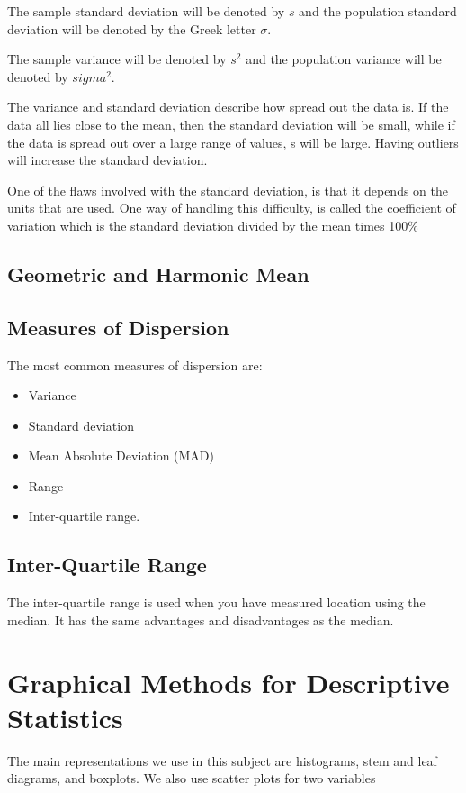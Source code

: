 \documentclass[12pt]{article}
\begin{document}
The sample standard deviation will be denoted by $s$ and the population standard deviation will be denoted by the Greek letter $\sigma$.

The sample variance will be denoted by $s^2$ and the population variance will be denoted by $sigma^2$.

The variance and standard deviation describe how spread out the data is.  If the data all lies close to the mean, then the standard deviation will be small, while if the data is spread out over a large range of values, s will be large.  Having outliers will increase the standard deviation.

One of the flaws involved with the standard deviation, is that it depends on the units that are used.  One way of handling this difficulty, is called the coefficient of variation which is the standard deviation divided by the mean times 100\%

\subsection{Geometric and Harmonic Mean}



\subsection{Measures of Dispersion}
The most common measures of dispersion are:
\begin{itemize}
\item Variance 
\item Standard deviation
\item Mean Absolute Deviation (MAD)
\item Range
\item Inter-quartile range.
\end{itemize}

\subsection{Inter-Quartile Range}
The inter-quartile range is used when you have measured location using the median. 
It has the same advantages and disadvantages as the median.

\newpage
\section{Graphical Methods for Descriptive Statistics}
The main representations we use in this subject are histograms, stem and leaf diagrams, and boxplots. We also use scatter plots for two variables
\end{document}
